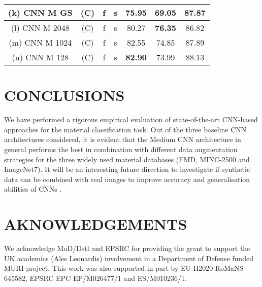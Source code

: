 \documentclass[a4paper,twoside]{article}
\begin{document}
\begin{table*}[!t]
\begin{tabular}{cccc|ccc}
(k) CNN M GS                                              & (C)                          & f                        & s                        & 75.95                                                            & 69.05                                                            & 87.87                                                                  \\ \hline
(l) CNN M 2048                                            & (C)                          & f                        & s                        & 80.27                                                            & \textbf{76.35}                                                   & 86.82                                                                  \\
(m) CNN M 1024                                            & (C)                          & f                        & s                        & 82.55                                                            & 74.85                                                            & 87.89                                                                  \\
(n) CNN M 128                                             & (C)                          & f                        & s                        & \textbf{82.90}                                                   & 73.99                                                            & 88.13                                                                 
\end{tabular}
\end{table*}

\section{\uppercase{CONCLUSIONS}}
\noindent We have performed a rigorous empirical evaluation of state-of-the-art CNN-based approaches for the material classification task. Out of the three baseline CNN architectures considered, it is evident that the Medium CNN architecture in general performs the best in combination with different data augmentation strategies for the three widely used material databases (FMD, MINC-2500 and ImageNet7). It will be an interesting future direction to investigate if synthetic data can be combined with real images to improve accuracy and generalisation abilities of CNNs \cite{25}.

\section*{AKNOWLEDGEMENTS}
\noindent We acknowledge MoD/Dstl and EPSRC for providing the grant to support the UK academics (Ales Leonardis) involvement in a Department of Defense funded MURI project. This work was also supported in part by EU H2020 RoMaNS 645582, EPSRC EPC EP/M026477/1 and ES/M010236/1.




{\small
}
\end{document}
